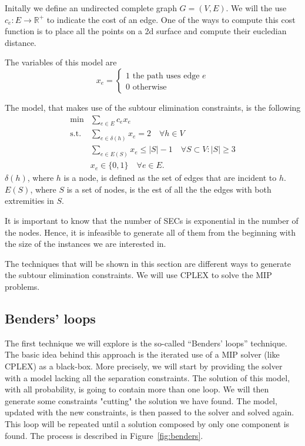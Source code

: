 \documentclass{article}
\begin{document}
Initally we define an undirected complete graph $G=(V, E)$.
We will the use $c_e : E \rightarrow \mathbb{R}^+$ to indicate the cost of
an edge.
One of the ways to compute this cost function is to place all the points
on a 2d surface and compute their eucledian distance.

The variables of this model are
\begin{equation*}
        x_e =
        \left\{
                \begin{array}{l}
                1 \text{ the path uses edge $e$}\\
                0 \text{ otherwise }
        \end{array}
        \right.
\end{equation*}

The model, that makes use of the subtour elimination constraints, is the
following
\begin{equation}
  \begin{aligned}
\min & \sum_{e \in E} c_e x_e \\
\text{s.t.}
& \sum_{e \in \delta(h)} x_{e} = 2 \quad \forall h \in V \\
& \sum_{e \in E(S)} x_{e} \leq |S| - 1 \quad \forall S \subset V : |S| \geq 3 \\
& x_{e} \in \{0, 1\} \quad \forall e \in E.
\end{aligned}
\end{equation}
$\delta(h)$, where $h$ is a node, is defined as the set of edges that are
incident to $h$. $E(S)$, where $S$ is a set of nodes, is the est of all the
the edges with both extremities in $S$.

It is important to know that the number of SECs is exponential in the number of
the nodes. Hence, it is infeasible to generate all of them from the beginning
with the size of the instances we are interested in.

The techniques that will be shown in this section are different ways to generate
the subtour elimination constraints. We will use CPLEX to solve the MIP
problems.
\subsection{Benders' loops}
\label{ssec:benders}
The first technique we will explore is the so-called ``Benders' loops'' technique.
The basic idea behind this approach is the iterated use of a MIP solver (like CPLEX)
as a black-box. More precisely, we will start by providing the solver with
a model lacking all the separation constraints. The solution of this model,
with all probability, is going to contain more than one loop. We will then
generate some constraints "cutting" the solution we have found.
The model, updated with the new constraints, is then passed to the solver
and solved again. This loop will be repeated until a solution composed by
only one component is found.
The process is described in Figure~\ref{fig:benders}.
\end{document}
